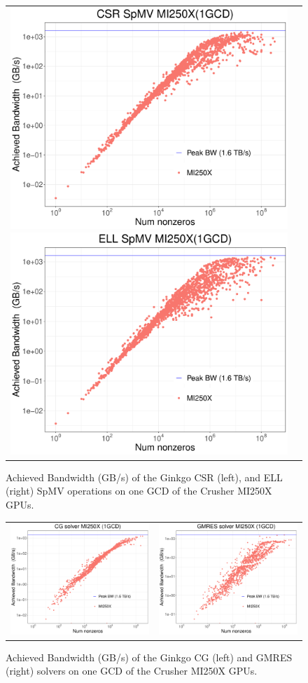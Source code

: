 \begin{figure}[!h]
  \centering
  \begin{tabular}{lr}
    \includegraphics[width=.34\columnwidth]{projects/2.3.3-MathLibs/2.3.3.13-CLOVER/ginkgo_eas/bw_csr_spmv.pdf}
    \includegraphics[width=.34\columnwidth]{projects/2.3.3-MathLibs/2.3.3.13-CLOVER/ginkgo_eas/bw_ell_spmv.pdf}
  \end{tabular}
  \caption{Achieved Bandwidth (GB/s) of the Ginkgo CSR (left), and ELL (right) SpMV operations on one GCD
    of the Crusher MI250X GPUs.}
  \label{fig:gko-crusher-spmv}
\end{figure}

\begin{figure}[!h]
  \centering
  \begin{tabular}{lr}
    \includegraphics[width=.34\columnwidth]{projects/2.3.3-MathLibs/2.3.3.13-CLOVER/ginkgo_eas/bw_cg_solver.pdf}
    &
    \includegraphics[width=.34\columnwidth]{projects/2.3.3-MathLibs/2.3.3.13-CLOVER/ginkgo_eas/bw_gmres_solver.pdf}
  \end{tabular}
  \caption{Achieved Bandwidth (GB/s) of the Ginkgo CG (left) and GMRES (right) solvers on one
    GCD of the Crusher MI250X GPUs.}
  \label{fig:gko-crusher-solvers}
\end{figure}
